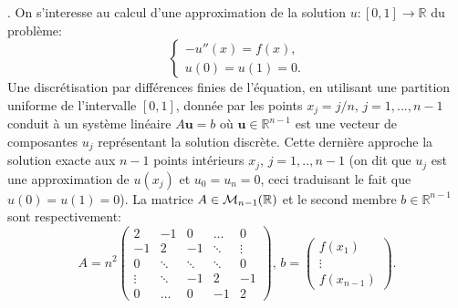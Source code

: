 \documentclass[12pt,a4paper]{article}
\begin{document}
. On s'interesse au calcul d'une approximation de la solution $u:[0,1]\rightarrow\mathbb{R}$ du probl\`eme:
\begin{equation}\label{prob}
\left\{\begin{array}{l}
-u''(x) = f(x),\\
u(0)=u(1)=0.
\end{array}\right.
\end{equation}
Une discr\'etisation par diff\'erences
finies de l'\'equation, en utilisant une partition uniforme de
l'intervalle $[0,1]$, donn\'ee par les points $x_j=j/n,\,j=1,...,n-1$
conduit \`a un syst\`eme lin\'eaire $A \mathbf{u} = b$
o\`u $\mathbf{u}\in\mathbb{R}^{n-1}$ est une vecteur de composantes $u_j$
repr\'esentant la solution discr\`ete. Cette derni\`ere approche la
solution exacte aux $n-1$ points int\'erieurs $x_j,\,j=1,..,n-1$ (on
dit que $u_j$ est une approximation de $u(x_j)$ et
$u_0=u_{n}=0$, ceci traduisant le fait que $u(0)=u(1)=0$).  La matrice $A\in{\cal M}_{n-1}(\mathbb{R})$ et le second membre $b\in \mathbb{R}^{n-1}$ sont respectivement:
\begin{equation}\label{matrice}
A=n^2\left(\begin{array}{ccccc}
2 & -1 & 0 & \hdots & 0\\
-1 & 2 & -1 & \ddots & \vdots \\
0 & \ddots & \ddots & \ddots & 0 \\
\vdots & \ddots & -1 & 2 & -1 \\
0 & \hdots & 0 & -1 & 2    
\end{array}\right),\,b = \left(\begin{array}{c}f(x_1)\\ \vdots \\ f(x_{n-1})\end{array}\right).
\end{equation}
\end{document}
